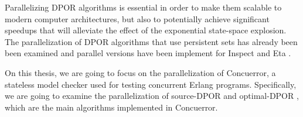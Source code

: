 Parallelizing DPOR algorithms is essential in order to make them scalable to modern computer architectures, but also to potentially 
achieve significant speedups that will alleviate the effect of the exponential state-space explosion. The parallelization of
DPOR algorithms that use persistent sets \cite{FlanaganDPOR, Lei:2006:RTC:1248722.1248743, 10.1007/3-540-53863-1_36} has already been 
been examined and parallel versions have been implement for Inspect \cite{Yang:2007:DDP:1770532.1770541} and Eta 
\cite{Simsa2012ScalableDP}.

On this thesis, we are going to focus on the parallelization of Concuerror, a stateless model checker
used for testing concurrent Erlang programs. Specifically, we are going to examine the parallelization
of source-DPOR \cite{AbdullaAronisJohnssonSagonasDPOR2014} and optimal-DPOR \cite{AbdullaAronisJohnssonSagonasDPOR2014}, 
which are the main algorithms implemented in Concuerror.




